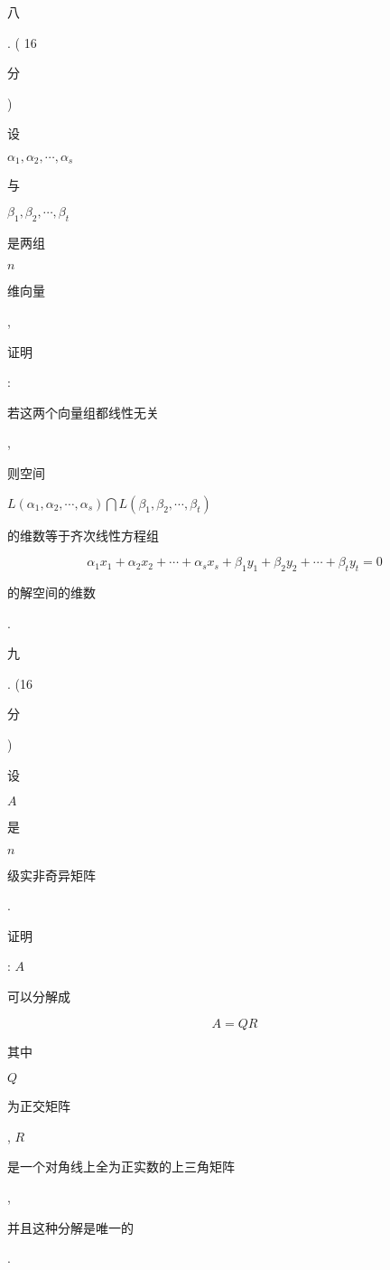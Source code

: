 \documentclass[10pt]{article}
\begin{document}
\begin{CJK}{UTF8}{mj}八\end{CJK}. ( 16 \begin{CJK}{UTF8}{mj}分\end{CJK}) \begin{CJK}{UTF8}{mj}设\end{CJK} $\alpha_{1}, \alpha_{2}, \cdots, \alpha_{s}$ \begin{CJK}{UTF8}{mj}与\end{CJK} $\beta_{1}, \beta_{2}, \cdots, \beta_{t}$ \begin{CJK}{UTF8}{mj}是两组\end{CJK} $n$ \begin{CJK}{UTF8}{mj}维向量\end{CJK}, \begin{CJK}{UTF8}{mj}证明\end{CJK}: \begin{CJK}{UTF8}{mj}若这两个向量组都线性无关\end{CJK}, \begin{CJK}{UTF8}{mj}则空间\end{CJK} $L\left(\alpha_{1}, \alpha_{2}, \cdots, \alpha_{s}\right) \bigcap L\left(\beta_{1}, \beta_{2}, \cdots, \beta_{t}\right)$ \begin{CJK}{UTF8}{mj}的维数等于齐次线性方程组\end{CJK}
$$
\alpha_{1} x_{1}+\alpha_{2} x_{2}+\cdots+\alpha_{s} x_{s}+\beta_{1} y_{1}+\beta_{2} y_{2}+\cdots+\beta_{t} y_{t}=0
$$
\begin{CJK}{UTF8}{mj}的解空间的维数\end{CJK}.

\begin{CJK}{UTF8}{mj}九\end{CJK}. (16 \begin{CJK}{UTF8}{mj}分\end{CJK}) \begin{CJK}{UTF8}{mj}设\end{CJK} $A$ \begin{CJK}{UTF8}{mj}是\end{CJK} $n$ \begin{CJK}{UTF8}{mj}级实非奇异矩阵\end{CJK}. \begin{CJK}{UTF8}{mj}证明\end{CJK}: $A$ \begin{CJK}{UTF8}{mj}可以分解成\end{CJK}
$$
A=Q R
$$
\begin{CJK}{UTF8}{mj}其中\end{CJK} $Q$ \begin{CJK}{UTF8}{mj}为正交矩阵\end{CJK}, $R$ \begin{CJK}{UTF8}{mj}是一个对角线上全为正实数的上三角矩阵\end{CJK}, \begin{CJK}{UTF8}{mj}并且这种分解是唯一的\end{CJK}.
\end{document}
